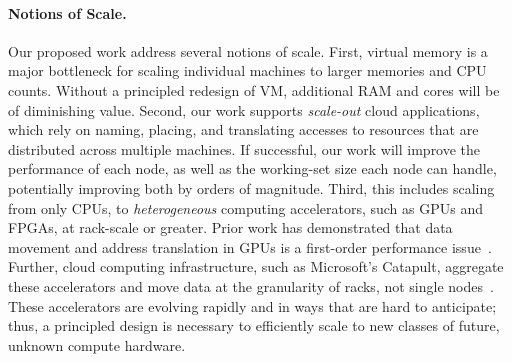 \paragraph{Notions of Scale.}  Our proposed work address several notions of
scale.  First, virtual memory is a major bottleneck for scaling individual
machines to larger memories and CPU counts.  Without a principled redesign of
VM, additional RAM and cores will be of diminishing value.  Second, our work
supports \emph{scale-out} cloud applications, which rely on naming, placing, and
translating accesses to resources that are distributed across multiple machines.
If successful, our work will improve the performance of each node, as well as
the working-set size each node can handle, potentially improving both by orders
of magnitude.  Third, this includes scaling from only CPUs, to {\em
heterogeneous} computing accelerators, such as GPUs and FPGAs, at rack-scale or
greater.  Prior work has demonstrated that data movement and address translation
in GPUs is a first-order performance issue~\cite{pichai:gpu,
power:gpummu,rossbach:ptask}. Further, cloud computing infrastructure, such as
Microsoft's Catapult, aggregate these accelerators and move data  at the
granularity of racks, not single nodes~\cite{putnam:catapult}.  These
accelerators are evolving rapidly and in ways that are hard to anticipate; thus,
a principled design is necessary to efficiently scale to new classes of future,
unknown compute hardware.
